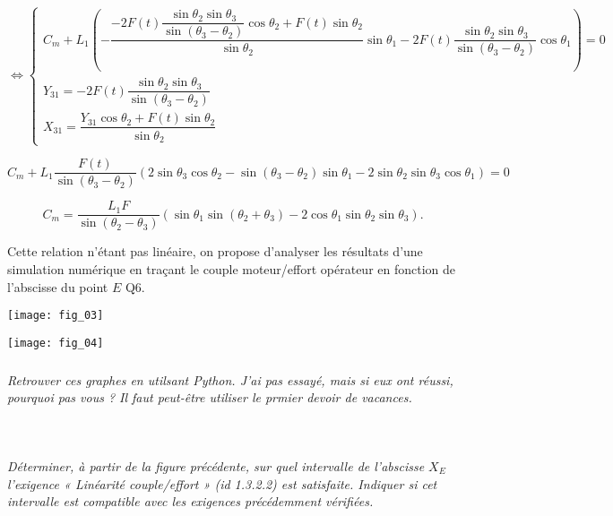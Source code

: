 \begin{multicols}{2}
\begin{corrige}
$\Leftrightarrow \left\{\begin{array}{l}
 C_m + L_1\left(- \dfrac{-2F(t)\dfrac{\sin \theta_2\sin\theta_3}{\sin \left(\theta_3-\theta_2 \right)}\cos\theta_2+ F(t)\sin \theta_2}{\sin \theta_2}\sin \theta_1-2F(t)\dfrac{\sin \theta_2\sin\theta_3}{\sin \left(\theta_3-\theta_2 \right)} \cos \theta_1 \right) =0 \\
Y_{31}  =-2F(t)\dfrac{\sin \theta_2\sin\theta_3}{\sin \left(\theta_3-\theta_2 \right)}  \\
 X_{31} = \dfrac{Y_{31}\cos\theta_2+ F(t)\sin \theta_2}{\sin \theta_2}
\end{array}
\right.
$


$ C_m + L_1 \dfrac{F(t)}{\sin \left(\theta_3-\theta_2 \right)}\left(2\sin\theta_3\cos\theta_2-\sin \left(\theta_3-\theta_2 \right)\sin \theta_1-2\sin \theta_2\sin\theta_3 \cos \theta_1 \right) =0$


\end{corrige}
\else
\fi
\else
\fi

$$C_m = \dfrac{L_1 F}{\sin \left(\theta_2 - \theta_3\right)}\left( \sin \theta_1 \sin\left( \theta_2+\theta_3 \right)  -2\cos \theta_1 \sin\theta_2\sin\theta_3\right).$$

Cette relation n’étant pas linéaire, on propose d’analyser les résultats d’une
simulation numérique en traçant le couple moteur/effort opérateur en fonction de l’abscisse du point $E$
Q6.

\begin{center}
\texttt{[image: fig\_03]}
\end{center}

\begin{center}
\texttt{[image: fig\_04]}
\end{center}


\subparagraph{}
\textit{Retrouver ces graphes en utilsant Python. J'ai pas essayé, mais si eux ont réussi, pourquoi pas vous ? Il faut peut-être utiliser le prmier devoir de vacances.}
\ifprof
\begin{corrige}~\\
\end{corrige}
\else
\fi


\subparagraph{}
\textit{Déterminer, à partir de la figure précédente, sur quel intervalle de l’abscisse $X_E$ l’exigence « Linéarité
couple/effort » (id 1.3.2.2) est satisfaite. Indiquer si cet intervalle est compatible avec les
exigences précédemment vérifiées.}
\ifprof
\begin{corrige}~\\
\end{corrige}
\else
\fi


\ifprof
\else
\end{multicols}
\fi


